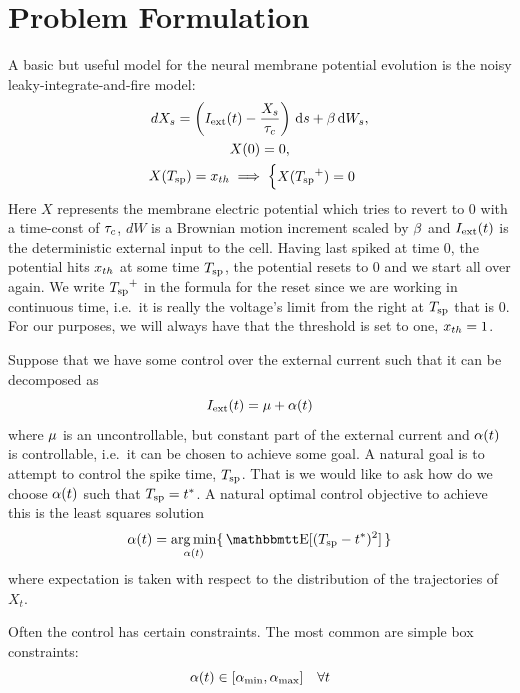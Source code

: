 \documentclass{article}
\begin{document}
\section{Problem Formulation}
A basic but useful model for the neural membrane potential evolution is the
noisy leaky-integrate-and-fire model:
\begin{equation}
\begin{gathered} 
dX_s = \left({ I_{\textrm{ext}} }(t) - \frac{X_s}{{ \tau_{c} }} \right) \, \mathrm{d} s + {\beta} \, \mathrm{d} W_s,
\\
X(0) = 0,
\\
X({ T_{\textrm{sp} } }) = { x_{th} } \implies   
\begin{cases}
X({ T_{\textrm{sp} } }^+) = 0 &  
\end{cases}
\end{gathered}
\label{eq:X_evolution_uo}
\end{equation}
Here $X$ represents the membrane electric potential which tries to revert to $0$
with a time-const of ${ \tau_{c} }$, $dW$ is a Brownian motion increment scaled by ${\beta}$
and ${ I_{\textrm{ext}} }(t)$ is the deterministic external input to the cell. Having last
spiked at time $0$, the potential hits ${ x_{th} }$ at some time ${ T_{\textrm{sp} } }$, the potential
resets to $0$ and we start all over again. We write ${ T_{\textrm{sp} } }^+$ in the formula for
the reset since we are working in continuous time, i.e.\ it is really the
voltage's limit from the right at ${ T_{\textrm{sp} } }$ that is 0. For our purposes, we will
always have that the threshold is set to one, ${ x_{th} } = 1$.

Suppose that we have some control over the external current such that it can be
decomposed as
\begin{equation}
{ I_{\textrm{ext}} }(t) = {\mu } + {\alpha}(t)
\label{eq:current_mu_alpha}
\end{equation}
where ${\mu }$ is an uncontrollable, but constant part of the external current and
${\alpha}(t)$ is controllable, i.e.\ it can be chosen to achieve some goal. 
A natural goal is to attempt to control the spike time, ${ T_{\textrm{sp} } }$. 
That is we would like to ask how do we choose ${\alpha}(t)$ such that ${ T_{\textrm{sp} } } = { t^* }$.
A natural optimal control objective to achieve this is the least squares solution
\begin{equation}
\a(t) = \argmin_{\a(t)} \{\, \Exp[(\ts- \T)^2] \,\}
\label{eq:OC_LS_variance}   
\end{equation}
where expectation is taken with respect to the distribution of the trajectories
of $X_t$.

Often the control has certain constraints. The most common are simple box
constraints:
\begin{equation}
{\alpha}(t) \in [{ {\alpha}_{\textrm{min}} }, { {\alpha}_{\textrm{max}} }] \quad \forall t
\label{eq:bound_constraints_alpha}
\end{equation}
\end{document}
